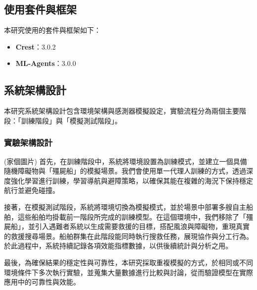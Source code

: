 \documentclass[12pt,a4paper]{article}
\begin{document}
\subsection{使用套件與框架}
本研究使用的套件與框架如下：
\begin{itemize}
    \item \textbf{Crest}：3.0.2
    \item \textbf{ML-Agents}：3.0.0
\end{itemize}

\newpage

\subsection{系統架構設計}
本研究系統架構設計包含環境架構與感測器模擬設定，實驗流程分為兩個主要階段：「訓練階段」與「模擬測試階段」。

\subsubsection{實驗架構設計}
(家個圖片)
首先，在訓練階段中，系統將環境設置為訓練模式，並建立一個具備隨機障礙物與「殭屍船」的模擬場景。我們會使用單一代理人訓練的方式，透過深度強化學習進行訓練，學習導航與避障策略，以確保其能在複雜的海況下保持穩定航行並避免碰撞。
\\ \par
接著，在模擬測試階段，系統將環境切換為模擬模式，並於場景中部署多艘自主船舶，這些船舶均掛載前一階段所完成的訓練模型。在這個環境中，我們移除了「殭屍船」，並引入遇難者系統以生成需要救援的目標，搭配風浪與障礙物，重現真實的救援搜尋場景。船舶群集在此階段能同時執行搜救任務，展現協作與分工行為。於此過程中，系統持續記錄各項效能指標數據，以供後續統計與分析之用。
\\ \par
最後，為確保結果的穩定性與可靠性，本研究採取重複模擬的方式，於相同或不同環境條件下多次執行實驗，並蒐集大量數據進行比較與討論，從而驗證模型在實際應用中的可靠性與效能。

\newpage
\end{document}
